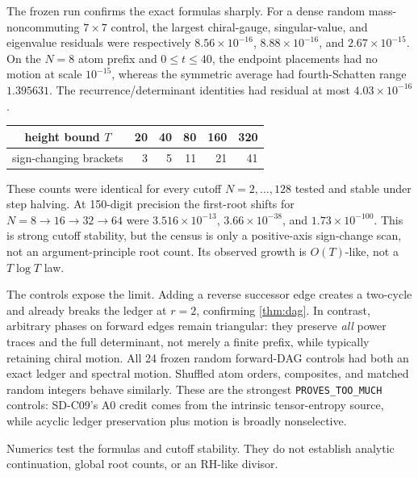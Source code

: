 The frozen run confirms the exact formulas sharply.  For a dense random
mass-noncommuting $7\times7$ control, the largest chiral-gauge, singular-value,
and eigenvalue residuals were respectively
$8.56\times10^{-16}$, $8.88\times10^{-16}$, and
$2.67\times10^{-15}$.  On the $N=8$ atom prefix and
$0\le t\le40$, the endpoint placements had no motion at scale
$10^{-15}$, whereas the symmetric average had fourth-Schatten range
$1.395631$.  The recurrence/determinant identities had residual at most
$4.03\times10^{-16}$.

\begin{center}
\small
\begin{tabular}{c|rrrrr}
\toprule
height bound $T$ & 20 & 40 & 80 & 160 & 320\\
\midrule
sign-changing brackets & 3 & 5 & 11 & 21 & 41\\
\bottomrule
\end{tabular}
\end{center}
These counts were identical for every cutoff $N=2,\ldots,128$ tested and
stable under step halving.  At 150-digit precision the first-root shifts for
$N=8\to16\to32\to64$ were $3.516\times10^{-13}$,
$3.66\times10^{-38}$, and $1.73\times10^{-100}$.  This is strong cutoff
stability, but the census is only a positive-axis sign-change scan, not an
argument-principle root count.  Its observed growth is $O(T)$-like, not a
$T\log T$ law.

The controls expose the limit.  Adding a reverse successor edge creates a
two-cycle and already breaks the ledger at $r=2$, confirming
\cref{thm:dag}.  In contrast, arbitrary phases on forward edges remain
triangular: they preserve \emph{all} power traces and the full determinant,
not merely a finite prefix, while typically retaining chiral motion.  All 24
frozen random forward-DAG controls had both an exact ledger and spectral
motion.  Shuffled atom orders, composites, and matched random integers behave
similarly.  These are the strongest \texttt{PROVES\_TOO\_MUCH} controls:
SD-C09's A0 credit comes from the intrinsic tensor-entropy source, while
acyclic ledger preservation plus motion is broadly nonselective.

Numerics test the formulas and cutoff stability.  They do not establish
analytic continuation, global root counts, or an RH-like divisor.
